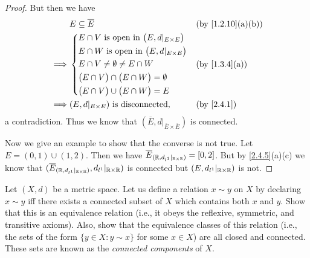 \begin{proof}
  But then we have
  \begin{align*}
             & E \subseteq \overline{E}                                     &  & \text{(by \cref{1.2.10}(a)(b))} \\
    \implies & \begin{dcases}
                 E \cap V \text{ is open in } \big(E, d|_{E \times E}\big) \\
                 E \cap W \text{ is open in } \big(E, d|_{E \times E}\big) \\
                 E \cap V \neq \emptyset \neq E \cap W                     \\
                 \big(E \cap V\big) \cap \big(E \cap W\big) = \emptyset    \\
                 \big(E \cap V\big) \cup \big(E \cap W\big) = E
               \end{dcases} &  & \text{(by \cref{1.3.4}(a))}                                         \\
    \implies & (E, d|_{E \times E}) \text{ is disconnected},                &  & \text{(by \cref{2.4.1})}
  \end{align*}
  a contradiction.
  Thus we know that \((\overline{E}, d|_{\overline{E} \times \overline{E}})\) is connected.

  Now we give an example to show that the converse is not true.
  Let \(E = (0, 1) \cup (1, 2)\).
  Then we have \(\overline{E}_{(\mathbb{R}, d_{l^1}|_{\mathbb{R} \times \mathbb{R}})} = [0, 2]\).
  But by \cref{2.4.5}(a)(c) we know that \((\overline{E}_{(\mathbb{R}, d_{l^1}|_{\mathbb{R} \times \mathbb{R}})}, d_{l^1}|_{\mathbb{R} \times \mathbb{R}})\) is connected but \((E, d_{l^1}|_{\mathbb{R} \times \mathbb{R}})\) is not.
\end{proof}

\begin{ex}\label{ex:2.4.9}
  Let \((X, d)\) be a metric space. Let us define a relation \(x \sim y\) on \(X\) by declaring \(x \sim y\) iff there exists a connected subset of \(X\) which contains both \(x\) and \(y\).
  Show that this is an equivalence relation (i.e., it obeys the reflexive, symmetric, and transitive axioms).
  Also, show that the equivalence classes of this relation (i.e., the sets of the form \(\{y \in  X : y \sim x\}\) for some \(x \in X\)) are all closed and connected.
  These sets are known as the \emph{connected components} of \(X\).
\end{ex}

